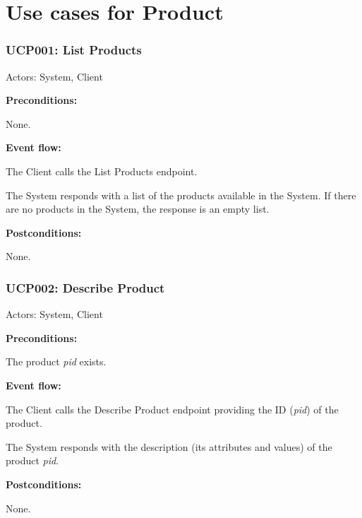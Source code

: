 \section{Use cases for Product}

\begin{ucbox}{\subsubsection{UCP001: List Products}}
\label{UCP001}

Actors: System, Client

\textbf{Preconditions:}

\ucitem None.

\textbf{Event flow:}

\ucitem The Client calls the List Products endpoint.

\ucitem The System responds with a list of the products available in the System. If there are no products in the System, the response is an empty list.

\textbf{Postconditions:}

\ucitem None.

\end{ucbox}

\begin{ucbox}{\subsubsection{UCP002: Describe Product}}
\label{UCP002}

Actors: System, Client

\textbf{Preconditions:} 

\ucitem The product \textit{pid} exists.

\textbf{Event flow:}

\ucitem The Client calls the Describe Product endpoint providing the ID (\textit{pid}) of the product.

\ucitem The System responds with the description (its attributes and values) of the product \textit{pid}.

\textbf{Postconditions:}

\ucitem None.

\end{ucbox}

